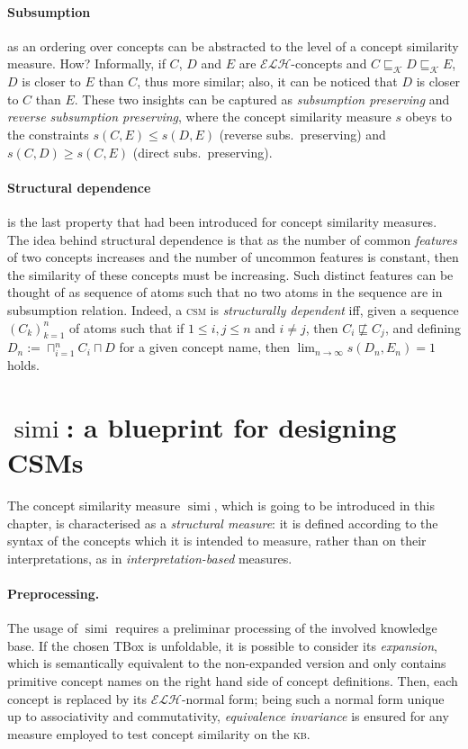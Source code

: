 \documentclass[]{llncs}
\DeclareMathOperator{\simi}{simi}
\newcommand{\elh}{\(\mathcal{ELH}{}\)}
\newcommand{\kb}{\textsc{kb}}
\newcommand{\csm}{\textsc{csm}}
\newcommand{\subsume}[1]{\sqsubseteq_{\mathcal{#1}}}
\begin{document}
  \paragraph{Subsumption} as an ordering over concepts can be abstracted to the level of a concept similarity measure. How?
  Informally, if \(C\), \(D\) and \(E\) are \elh-concepts and \(C \subsume{K} D \subsume{K} E\), \(D\) is closer to \(E\) than \(C\), thus more similar;
  also, it can be noticed that \(D\) is closer to \(C\) than \(E\).
  These two insights can be captured as \emph{subsumption preserving} and \emph{reverse subsumption preserving}, where the concept similarity measure \(s\) obeys to the constraints \(s(C,E) \le s(D,E)\) (reverse subs.\ preserving) and \(s(C,D) \ge s(C,E)\) (direct subs.\ preserving).

  \paragraph{Structural dependence} is the last property that had been introduced for concept similarity measures.
  The idea behind structural dependence is that as the number of common \emph{features} of two concepts increases and the number of uncommon features is constant, then the similarity of these concepts must be increasing.
  Such distinct features can be thought of as sequence of atoms such that no two atoms in the sequence are in subsumption relation.
  Indeed, a \csm{} is \emph{structurally dependent} iff, given a sequence \({(C_k)}_{k=1}^n\) of atoms such that if \(1 \le i,j \le n\) and \(i \ne j\), then \(C_i \not\sqsubseteq C_j\), and defining \(D_n := \sqcap_{i=1}^n C_i \sqcap D\) for a given concept name, then \(\lim_{n \to \infty}s(D_n,E_n) = 1\) holds.

  \section{\(\simi{}\): a blueprint for designing CSMs}

  The concept similarity measure \(\simi\), which is going to be introduced in this chapter, is characterised as a \emph{structural measure}: it is defined according to the syntax of the concepts which it is intended to measure, rather than on their interpretations, as in \emph{interpretation-based} measures.

  \paragraph{Preprocessing.}
  The usage of \(\simi{}\) requires a preliminar processing of the involved knowledge base.
  If the chosen TBox is unfoldable, it is possible to consider its \emph{expansion}, which is semantically equivalent to the non-expanded version and only contains primitive concept names on the right hand side of concept definitions.
  Then, each concept is replaced by its \elh-normal form; being such a normal form unique up to associativity and commutativity, \emph{equivalence invariance} is ensured for any measure employed to test concept similarity on the \kb.
\end{document}
